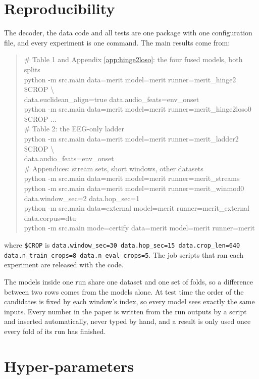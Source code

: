 \section{Reproducibility}
\label{app:repro}

The decoder, the data code and all tests are one package with one configuration
file, and every experiment is one command. The main results come from:

\begin{quote}\small\ttfamily
\# Table 1 and Appendix \ref{app:hinge2loso}: the four fused models, both splits\\
python -m src.main data=merit model=merit runner=merit\_hinge2 \$CROP \textbackslash\\
\quad data.euclidean\_align=true data.audio\_feats=env\_onset\\
python -m src.main data=merit model=merit runner=merit\_hinge2loso0 \$CROP ...\\
\# Table 2: the EEG-only ladder\\
python -m src.main data=merit model=merit runner=merit\_ladder2 \$CROP \textbackslash\\
\quad data.audio\_feats=env\_onset\\
\# Appendices: stream sets, short windows, other datasets\\
python -m src.main data=merit model=merit runner=merit\_streams\\
python -m src.main data=merit model=merit runner=merit\_winmod0 data.window\_sec=2 data.hop\_sec=1\\
python -m src.main data=external model=merit runner=merit\_external data.corpus=dtu\\
python -m src.main mode=certify data=merit model=merit runner=merit
\end{quote}
where \texttt{\$CROP} is \texttt{data.window\_sec=30 data.hop\_sec=15
data.crop\_len=640 data.n\_train\_crops=8 data.n\_eval\_crops=5}. The job scripts
that ran each experiment are released with the code.

The models inside one run share one dataset and one set of folds, so a difference
between two rows comes from the models alone. At test time the order of the
candidates is fixed by each window's index, so every model sees exactly the same
inputs. Every number in the paper is written from the run outputs by a script and
inserted automatically, never typed by hand, and a result is only used once every
fold of its run has finished.

\section{Hyper-parameters}
\label{app:hp}

